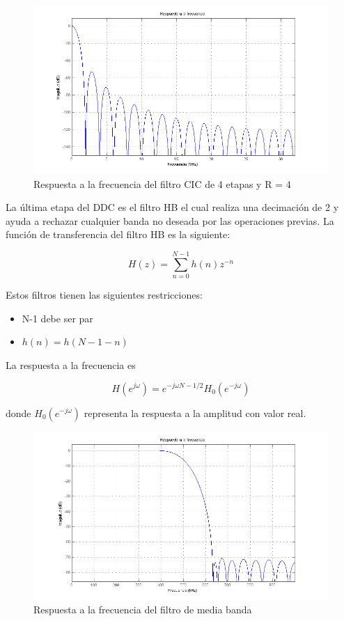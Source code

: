 \begin{figure}[tp]
\centering
	\includegraphics[width=5.9in]{figs/cicresponse}
	\caption{Respuesta a la frecuencia del filtro CIC de 4 etapas y R =	4}
	\label{fig:cicresp}
\end{figure}

La \'ultima etapa del DDC es el filtro HB el cual realiza una decimaci\'on de 2
y ayuda a rechazar cualquier banda no deseada por las operaciones previas. La
funci\'on de transferencia del filtro HB \cite{nguyen} es la
siguiente:

\begin{equation}
H(z)=\sum_{n=0}^{N-1}h(n)z^{-n}
\end{equation}

Estos filtros tienen las siguientes restricciones:

\begin{itemize}
  \item N-1 debe ser par
  \item $h(n)=h(N-1-n)$
\end{itemize}

La respuesta a la frecuencia es

\begin{equation}
H(e^{j\omega})=e^{-j\omega N-1/2}H_0(e^{-j\omega})
\end{equation}

donde $H_0(e^{-j\omega})$ representa la respuesta a la amplitud con valor real.

\begin{figure}[pt]
\centering
	\includegraphics[width=5.9in]{figs/hbresponse}
	\caption{Respuesta a la frecuencia del filtro de media banda}
	\label{fig:hbresp}
\end{figure}

